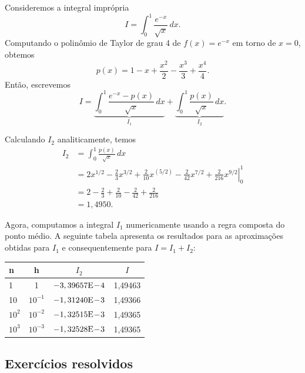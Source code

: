 \begin{ex}
  Consideremos a integral imprópria
  \begin{equation}
    I = \int_0^1 \frac{e^{-x}}{\sqrt{x}}\,dx.
  \end{equation}
Computando o polinômio de Taylor de grau 4 de $f(x) = e^{-x}$ em torno de $x=0$, obtemos
\begin{equation}
  p(x) = 1 - x + \frac{x^2}{2} - \frac{x^3}{3} + \frac{x^4}{4}.
\end{equation}
Então, escrevemos
\begin{equation}
  I = \underbrace{\int_0^1 \frac{e^{-x}-p(x)}{\sqrt{x}}\,dx}_{I_1} + \underbrace{\int_0^1 \frac{p(x)}{\sqrt{x}}\,dx}_{I_2}.
\end{equation}

Calculando $I_2$ analiticamente, temos
\begin{equation}
  \begin{split}
    I_2 &= \int_0^1 \frac{p(x)}{\sqrt{x}}\,dx\\
    &= \left.2x^{1/2} - \frac{2}{3}x^{3/2} + \frac{2}{10}x^{(5/2)} - \frac{2}{42}x^{7/2} + \frac{2}{216}x^{9/2} \right|_0^1\\
    &= 2 - \frac{2}{3} + \frac{2}{10} - \frac{2}{42} + \frac{2}{216}\\
    &= 1,4950.
  \end{split}
\end{equation}

Agora, computamos a integral $I_1$ numericamente usando a regra composta do ponto médio. A seguinte tabela apresenta os resultados para as aproximações obtidas para $I_1$ e consequentemente para $I = I_1 + I_2$:
\begin{center}
  \begin{tabular}{lc|c|c}\hline
    n      & h        & $I_2$ & $I$\\\hline
    1      & 1        & $-3,39657\mathrm{E}\!-\!4$ & 1,49463\\
    10     & $10^{-1}$ & $-1,31240\mathrm{E}\!-\!3$ & 1,49366\\
    $10^2$ & $10^{-2}$ & $-1,32515\mathrm{E}\!-\!3$ & 1,49365\\
    $10^3$ & $10^{-3}$ & $-1,32528\mathrm{E}\!-\!3$ & 1,49365\\\hline
  \end{tabular}
\end{center}
\end{ex}


\subsection*{Exercícios resolvidos}

